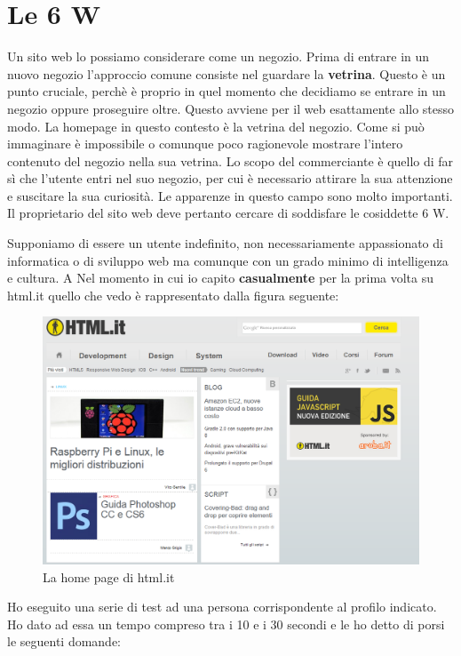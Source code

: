 \section{Le 6 W}

Un sito web lo possiamo considerare come un negozio. Prima di entrare in un nuovo negozio l'approccio comune consiste nel guardare la \textbf{vetrina}. Questo è un punto cruciale, perchè è proprio in quel momento che decidiamo se entrare in un negozio oppure proseguire oltre. Questo avviene per il web esattamente allo stesso modo. La homepage in questo contesto è la vetrina del negozio. Come si può immaginare è impossibile o comunque poco ragionevole mostrare l'intero contenuto del negozio nella sua vetrina. Lo scopo del commerciante è quello di far sì che l'utente entri nel suo negozio, per cui è necessario attirare la sua attenzione e suscitare la sua curiosità. Le apparenze in questo campo sono molto importanti. Il proprietario del sito web deve pertanto cercare di soddisfare le cosiddette 6 W.

Supponiamo di essere un utente indefinito, non necessariamente appassionato di informatica o di sviluppo web ma comunque con un grado minimo di intelligenza e cultura. A Nel momento in cui io capito \textbf{casualmente} per la prima volta su html.it quello che vedo è rappresentato dalla figura seguente:

\begin{figure}[H]
\centering
\includegraphics[width=120mm]{images/home.png}
\caption{La home page di html.it}
\end{figure}

Ho eseguito una serie di test ad una persona corrispondente al profilo indicato. Ho dato ad essa un tempo compreso tra i 10 e i 30 secondi e le ho detto di porsi le seguenti domande:

